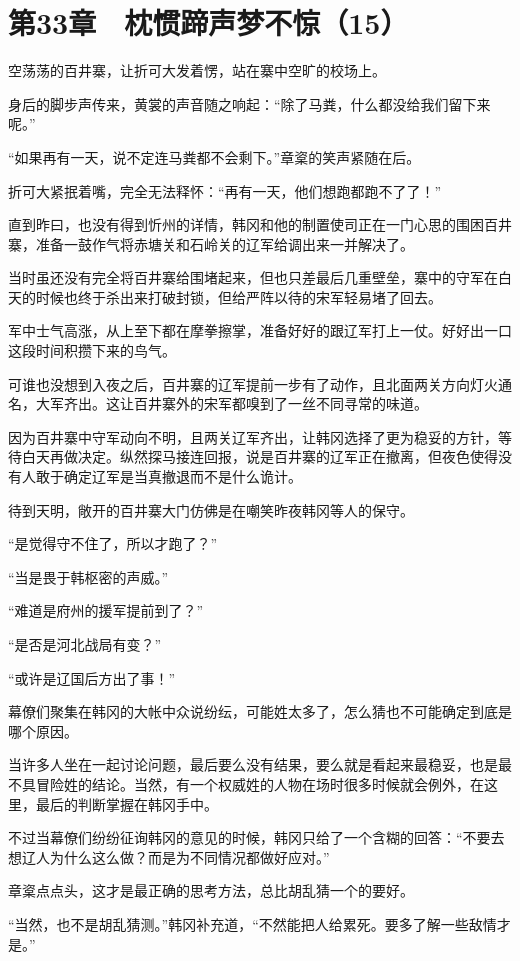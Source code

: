 \section{第33章　枕惯蹄声梦不惊（15）}

空荡荡的百井寨，让折可大发着愣，站在寨中空旷的校场上。

身后的脚步声传来，黄裳的声音随之响起：“除了马粪，什么都没给我们留下来呢。”

“如果再有一天，说不定连马粪都不会剩下。”章楶的笑声紧随在后。

折可大紧抿着嘴，完全无法释怀：“再有一天，他们想跑都跑不了了！”

直到昨曰，也没有得到忻州的详情，韩冈和他的制置使司正在一门心思的围困百井寨，准备一鼓作气将赤塘关和石岭关的辽军给调出来一并解决了。

当时虽还没有完全将百井寨给围堵起来，但也只差最后几重壁垒，寨中的守军在白天的时候也终于杀出来打破封锁，但给严阵以待的宋军轻易堵了回去。

军中士气高涨，从上至下都在摩拳擦掌，准备好好的跟辽军打上一仗。好好出一口这段时间积攒下来的鸟气。

可谁也没想到入夜之后，百井寨的辽军提前一步有了动作，且北面两关方向灯火通名，大军齐出。这让百井寨外的宋军都嗅到了一丝不同寻常的味道。

因为百井寨中守军动向不明，且两关辽军齐出，让韩冈选择了更为稳妥的方针，等待白天再做决定。纵然探马接连回报，说是百井寨的辽军正在撤离，但夜色使得没有人敢于确定辽军是当真撤退而不是什么诡计。

待到天明，敞开的百井寨大门仿佛是在嘲笑昨夜韩冈等人的保守。

“是觉得守不住了，所以才跑了？”

“当是畏于韩枢密的声威。”

“难道是府州的援军提前到了？”

“是否是河北战局有变？”

“或许是辽国后方出了事！”

幕僚们聚集在韩冈的大帐中众说纷纭，可能姓太多了，怎么猜也不可能确定到底是哪个原因。

当许多人坐在一起讨论问题，最后要么没有结果，要么就是看起来最稳妥，也是最不具冒险姓的结论。当然，有一个权威姓的人物在场时很多时候就会例外，在这里，最后的判断掌握在韩冈手中。

不过当幕僚们纷纷征询韩冈的意见的时候，韩冈只给了一个含糊的回答：“不要去想辽人为什么这么做？而是为不同情况都做好应对。”

章楶点点头，这才是最正确的思考方法，总比胡乱猜一个的要好。

“当然，也不是胡乱猜测。”韩冈补充道，“不然能把人给累死。要多了解一些敌情才是。”

